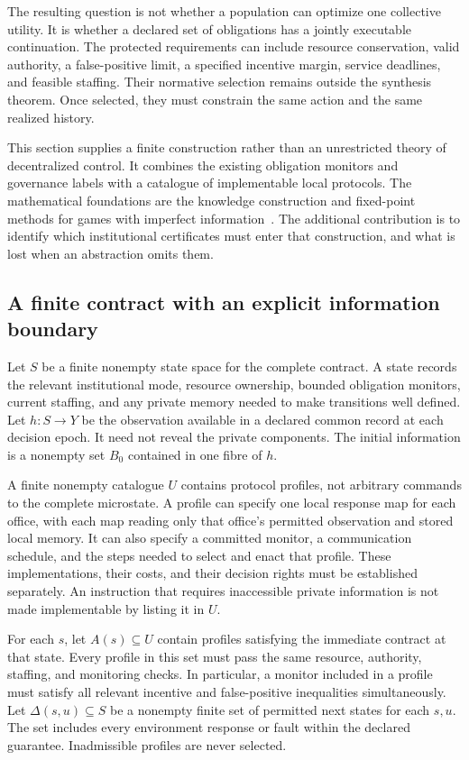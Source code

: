 The resulting question is not whether a population can optimize one collective utility. It is whether a declared set of obligations has a jointly executable continuation. The protected requirements can include resource conservation, valid authority, a false-positive limit, a specified incentive margin, service deadlines, and feasible staffing. Their normative selection remains outside the synthesis theorem. Once selected, they must constrain the same action and the same realized history.

This section supplies a finite construction rather than an unrestricted theory of decentralized control. It combines the existing obligation monitors and governance labels with a catalogue of implementable local protocols. The mathematical foundations are the knowledge construction and fixed-point methods for games with imperfect information~\cite{MS:chatterjee}. The additional contribution is to identify which institutional certificates must enter that construction, and what is lost when an abstraction omits them.

\subsection{A finite contract with an explicit information boundary}
Let $S$ be a finite nonempty state space for the complete contract. A state records the relevant institutional mode, resource ownership, bounded obligation monitors, current staffing, and any private memory needed to make transitions well defined. Let $h:S\to Y$ be the observation available in a declared common record at each decision epoch. It need not reveal the private components. The initial information is a nonempty set $B_0$ contained in one fibre of $h$.

A finite nonempty catalogue $U$ contains protocol profiles, not arbitrary commands to the complete microstate. A profile can specify one local response map for each office, with each map reading only that office's permitted observation and stored local memory. It can also specify a committed monitor, a communication schedule, and the steps needed to select and enact that profile. These implementations, their costs, and their decision rights must be established separately. An instruction that requires inaccessible private information is not made implementable by listing it in $U$.

For each $s$, let $A(s)\subseteq U$ contain profiles satisfying the immediate contract at that state. Every profile in this set must pass the same resource, authority, staffing, and monitoring checks. In particular, a monitor included in a profile must satisfy all relevant incentive and false-positive inequalities simultaneously. Let $\Delta(s,u)\subseteq S$ be a nonempty finite set of permitted next states for each $s,u$. The set includes every environment response or fault within the declared guarantee. Inadmissible profiles are never selected.

